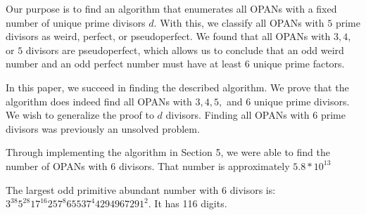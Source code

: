 \documentclass[../paper.tex]{article}
\begin{document}
Our purpose is to find an algorithm that enumerates all OPANs
with a fixed number of unique prime divisors $d$. With this, we
classify all OPANs with $5$ prime divisors as weird, perfect, or pseudoperfect.
We found that all OPANs with $3, 4$, or $5$ divisors are pseudoperfect,
which allows us to conclude that an odd weird number and an odd perfect number must have at least $6$ unique prime factors.

In this paper, we succeed in finding the described algorithm. 
We prove that the algorithm does indeed find all OPANs with $3, 4, 5, $ and $6$
unique prime divisors. We wish to generalize the proof to $d$ divisors.
Finding all OPANs with $6$ prime divisors 
was previously an unsolved problem\cite{amato}.

Through implementing the algorithm in Section 5, we were able to find the
number of OPANs with 6 divisors. That number is approximately $5.8
* 10^{13}$

The largest odd primitive abundant number with 6 divisors is:
$3^{38} 5^{28} 17^{16} 257^8 65537^4 4294967291^2$. It has 116 digits.





\end{document}
